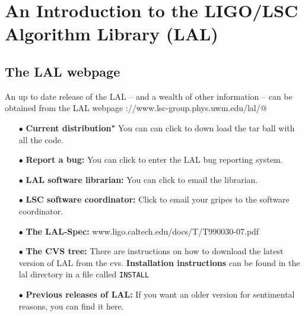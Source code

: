 \documentclass[oneside]{book}
\begin{document}
\chapter{An Introduction to the LIGO/LSC Algorithm Library (LAL)}

\section{The LAL webpage}

An up to date release  of the LAL -- and a wealth of other information
-- can be obtained from the LAL webpage
\verb@http://www.lsc-group.phys.uwm.edu/lal/@

\begin{itemize}
   \vspace*{-0.1in}
    \item[$\bullet$ ]  {\bf Current distribution"} You can can click
                       to down load the tar ball with all the code.
    \vspace*{-0.051in}
    \item[$\bullet$ ] {\bf Report a bug:}  You can click to enter
                      the LAL bug reporting system.
    \vspace*{-0.051in}
    \item[$\bullet$ ] {\bf LAL software librarian:}  You can click to
                      email the librarian.
    \vspace*{-0.051in}
    \item[$\bullet$ ] {\bf LSC software coordinator:} Click
                      to email your gripes to the software coordinator.
    \vspace*{-0.051in}
    \item[$\bullet$ ] {\bf The LAL-Spec:} 
                      www.ligo.caltech.edu/docs/T/T990030-07.pdf
    \vspace*{-0.051in}
    \item[$\bullet$ ] {\bf The CVS tree:}  There are instructions
                      on how to download the latest version of
                      LAL from the cvs. {\bf Installation
                      instructions} can be found in the lal
                      directory in a file called {\tt INSTALL}
    \vspace*{-0.051in}
    \item[$\bullet$]  {\bf Previous releases of LAL:} If you want an older 
                      version for sentimental reasons, you can find it here.
    \vspace*{-0.051in}

\end{itemize}
\end{document}
